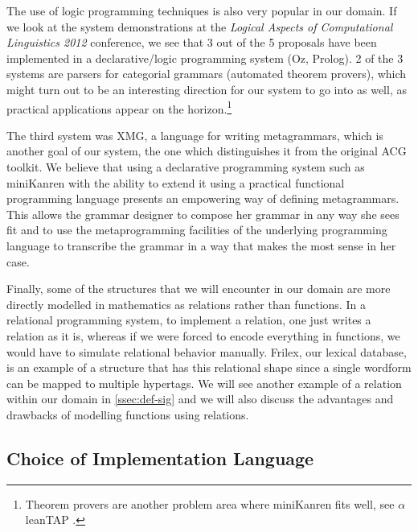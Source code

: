 The use of logic programming techniques is also very popular in our
domain. If we look at the system demonstrations at the \emph{Logical
  Aspects of Computational Linguistics 2012} conference, we see that 3
out of the 5 proposals have been implemented in a declarative/logic
programming system (Oz, Prolog). 2 of the 3 systems are parsers for
categorial grammars (automated theorem provers), which might turn out to
be an interesting direction for our system to go into as well, as
practical applications appear on the horizon.\footnote{Theorem provers
  are another problem area where miniKanren fits well, see
  $\alpha$leanTAP \cite{near2008alpha}.}

The third system was XMG, a language for writing metagrammars, which is
another goal of our system, the one which distinguishes it from the
original ACG toolkit. We believe that using a declarative programming
system such as miniKanren with the ability to extend it using a
practical functional programming language presents an empowering way of
defining metagrammars. This allows the grammar designer to compose her
grammar in any way she sees fit and to use the metaprogramming
facilities of the underlying programming language to transcribe the
grammar in a way that makes the most sense in her case.

Finally, some of the structures that we will encounter in our domain are
more directly modelled in mathematics as relations rather than
functions. In a relational programming system, to implement a relation,
one just writes a relation as it is, whereas if we were forced to encode
everything in functions, we would have to simulate relational behavior
manually. Frilex, our lexical database, is an example of a structure
that has this relational shape since a single wordform can be mapped to
multiple hypertags. We will see another example of a relation within our
domain in \ref{ssec:def-sig} and we will also discuss the advantages and
drawbacks of modelling functions using relations.

\subsection{Choice of Implementation Language}

